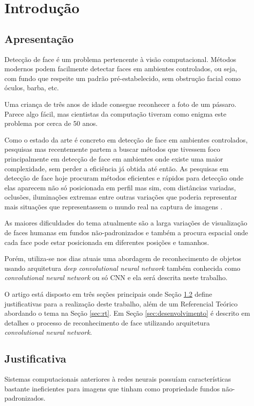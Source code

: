 \documentclass[10pt, conference]{IEEEtran}
\begin{document}
\IEEEpeerreviewmaketitle


\section{Introdução}
	\subsection{Apresentação}
		Detecção de face é um problema pertencente à visão computacional. Métodos modernos podem facilmente detectar faces em ambientes controlados, ou seja, com fundo que respeite um padrão pré-estabelecido, sem obstrução facial como óculos, barba, etc.

		Uma criança de três anos de idade consegue reconhecer a foto de um pássaro. Parece algo fácil, mas cientistas da computação tiveram como enigma este problema por cerca de 50 anos.

		Como o estado da arte é concreto em detecção de face em ambientes controlados, pesquisas mas recentemente partem a buscar métodos que tivessem foco principalmente em detecção de face em ambientes onde existe uma maior complexidade, sem perder a eficiência já obtida até então. As pesquisas em detecção de face hoje procuram métodos eficientes e rápidos para detecção onde elas aparecem não só posicionada em perfil mas sim, com distâncias variadas, oclusões, iluminações extremas entre outras variações que poderia representar mais situações que representassem o mundo real na captura de imagens \cite{Haoxiang2015}.

		As maiores dificuldades do tema atualmente são a larga variações de visualização de faces humanas em fundos não-padronizados e também a procura espacial onde cada face pode estar posicionada em diferentes posições e tamanhos.

		Porém, utiliza-se nos dias atuais uma abordagem de reconhecimento de objetos usando arquitetura \textit{deep convolutional neural network} também conhecida como \textit{convolutional neural network} ou só CNN e ela será descrita neste trabalho.

		O artigo está disposto em três seções principais onde Seção \ref{sec:justificativa} define justificativas para a realização deste trabalho, além de um Referencial Teórico abordando o tema na Seção \ref{sec:rt}. Em Seção \ref{sec:desenvolvimento} é descrito em detalhes o processo de reconhecimento de face utilizando arquitetura \textit{convolutional neural network}.


\subsection{Justificativa} \label{sec:justificativa}
	Sistemas computacionais anteriores à redes neurais possuíam características bastante ineficientes para imagens que tinham como propriedade fundos não-padronizados.
\end{document}
